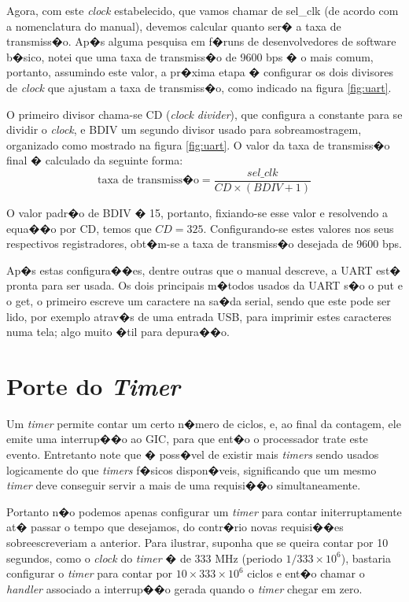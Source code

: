 \documentclass{ufscThesis/ufscThesis} %
\begin{document}
Agora, com este \emph{clock} estabelecido, que vamos chamar de sel\_clk (de acordo com a nomenclatura do manual), devemos calcular quanto ser� a taxa de transmiss�o.
Ap�s alguma pesquisa em f�runs de desenvolvedores de software b�sico, notei que uma taxa de transmiss�o de 9600 bps � o mais comum, portanto, assumindo este valor, a pr�xima etapa � configurar os dois divisores de \emph{clock} que ajustam a taxa de transmiss�o, como indicado na figura \ref{fig:uart}.

O primeiro divisor chama-se CD (\emph{clock divider}), que configura a constante para se dividir o \emph{clock}, e BDIV um segundo divisor usado para sobreamostragem, organizado como mostrado na figura \ref{fig:uart}. O valor da taxa de transmiss�o final � calculado da seguinte forma:
\begin{equation}
	\text{taxa de transmiss�o} = \frac{sel\_clk}{CD \times (BDIV+1)}
\end{equation}

O valor padr�o de BDIV � 15, portanto, fixiando-se esse valor e resolvendo a equa��o por CD, temos que $CD = 325$. Configurando-se estes valores nos seus respectivos registradores, obt�m-se a taxa de transmiss�o desejada de 9600 bps.

Ap�s estas configura��es, dentre outras que o manual descreve, a UART est� pronta para ser usada. Os dois principais m�todos usados da UART s�o o put e o get, o primeiro escreve um caractere na sa�da serial, sendo que este pode ser lido, por exemplo atrav�s de uma entrada USB, para imprimir estes caracteres numa tela; algo muito �til para depura��o.

\section{Porte do \emph{Timer}}



Um \emph{timer} permite contar um certo n�mero de ciclos, e, ao final da contagem, ele emite uma interrup��o ao GIC, para que ent�o o processador trate este evento. Entretanto note que � poss�vel de existir mais \emph{timers} sendo usados logicamente do que \emph{timers} f�sicos dispon�veis, significando que um mesmo \emph{timer} deve conseguir servir a mais de uma requisi��o simultaneamente.

Portanto n�o podemos apenas configurar um \emph{timer} para contar initerruptamente at� passar o tempo que desejamos, do contr�rio novas requisi��es sobreescreveriam a anterior. Para ilustrar, suponha que se queira contar por 10 segundos, como o \emph{clock} do \emph{timer} � de 333 MHz (periodo $1/333 \times 10^6$), bastaria configurar o \emph{timer} para contar por $10 \times 333 \times 10^6$ ciclos e ent�o chamar o \emph{handler} associado a interrup��o gerada quando o \emph{timer} chegar em zero.
\end{document}
